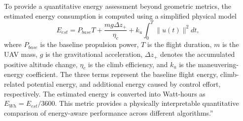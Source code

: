 \documentclass[12pt, twosides]{article}
\theoremstyle{definition}
\begin{document}
To provide a quantitative energy assessment beyond geometric metrics, the estimated energy consumption is computed using a simplified physical model
\[
E_{est} = P_{base} T + \frac{m g \Delta z_+}{\eta_c} + k_u \int_0^T \| u(t) \|^2 dt,
\]
where $P_{base}$ is the baseline propulsion power, $T$ is the flight duration, $m$ is the UAV mass, $g$ is the gravitational acceleration, $\Delta z_+$ denotes the accumulated positive altitude change, $\eta_c$ is the climb efficiency, and $k_u$ is the maneuvering-energy coefficient. The three terms represent the baseline flight energy, climb-related potential energy, and additional energy caused by control effort, respectively. The estimated energy is converted into Watt-hours as $E_{Wh}=E_{est}/3600$. This metric provides a physically interpretable quantitative comparison of energy-aware performance across different algorithms.''
\end{document}
